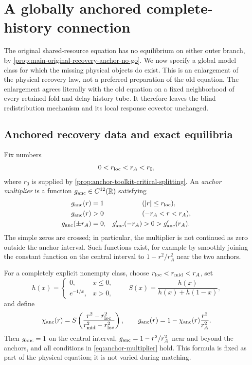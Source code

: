 \section{A globally anchored complete-history connection}
\label{sec:anchored-physical-connection}

The original shared-resource equation has no equilibrium on either outer
branch, by \cref{prop:main-original-recovery-anchor-no-go}.  We now specify a
global model class for which the missing physical objects do exist.  This is
an enlargement of the physical recovery law, not a preferred preparation of
the old equation.  The enlargement agrees literally with the old equation on
a fixed neighborhood of every retained fold and delay-history tube.  It
therefore leaves the blind redistribution mechanism and its local response
covector unchanged.

\subsection{Anchored recovery data and exact equilibria}

Fix numbers
\begin{equation}
 0<r_{\rm loc}<r_A<r_0,                              \label{eq:anchor-radii}
\end{equation}
where \(r_0\) is supplied by
\cref{prop:anchor-toolkit-critical-splitting}.  An \emph{anchor multiplier} is a
function \(g_{\rm anc}\in C^{12}(\mathbb R)\) satisfying
\begin{align}
 g_{\rm anc}(r)&=1 &&(|r|\le r_{\rm loc}),\notag\\
 g_{\rm anc}(r)&>0 &&(-r_A<r<r_A),\notag\\
 g_{\rm anc}(\pm r_A)&=0,&
 g_{\rm anc}'(-r_A)&>0>g_{\rm anc}'(r_A).           \label{eq:anchor-multiplier}
\end{align}
The simple zeros are crossed; in particular, the multiplier is not continued
as zero outside the anchor interval.  Such functions exist, for example by
smoothly joining the constant function on the central interval to
\(1-r^2/r_A^2\) near the two anchors.

For a completely explicit nonempty class, choose
\(r_{\rm loc}<r_{\rm mid}<r_A\), set
\begin{equation}
 h(x)=\begin{cases}0,&x\le0,\\ e^{-1/x},&x>0,\end{cases}
 \qquad
 S(x)=\frac{h(x)}{h(x)+h(1-x)},                    \label{eq:anchor-smooth-step}
\end{equation}
and define
\begin{equation}
 \chi_{\rm anc}(r)
 =S\left(\frac{r^2-r_{\rm loc}^2}
                 {r_{\rm mid}^2-r_{\rm loc}^2}\right),
 \qquad
 g_{\rm anc}(r)=1-\chi_{\rm anc}(r)\frac{r^2}{r_A^2}.       \label{eq:anchor-explicit-multiplier}
\end{equation}
Then \(g_{\rm anc}=1\) on the central interval,
\(g_{\rm anc}=1-r^2/r_A^2\) near and beyond the anchors, and all conditions
in \cref{eq:anchor-multiplier} hold.  This formula is fixed as part of the
physical equation; it is not varied during matching.

